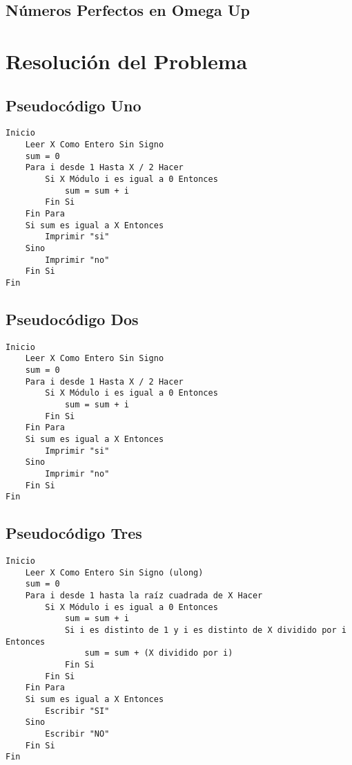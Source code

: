 \documentclass{article}
\begin{document}
    \subsection{Números Perfectos en Omega Up}
    \section{Resolución del Problema}
\subsection{Pseudocódigo Uno}
\lstset{language=pseudocode}
\begin{lstlisting}
Inicio
    Leer X Como Entero Sin Signo
    sum = 0
    Para i desde 1 Hasta X / 2 Hacer
        Si X Módulo i es igual a 0 Entonces
            sum = sum + i    
        Fin Si
    Fin Para
    Si sum es igual a X Entonces
        Imprimir "si"
    Sino
        Imprimir "no"
    Fin Si
Fin
\end{lstlisting}

\subsection{Pseudocódigo Dos}
\lstset{language=pseudocode}
\begin{lstlisting}
Inicio
    Leer X Como Entero Sin Signo
    sum = 0
    Para i desde 1 Hasta X / 2 Hacer
        Si X Módulo i es igual a 0 Entonces
            sum = sum + i  
        Fin Si
    Fin Para
    Si sum es igual a X Entonces
        Imprimir "si"
    Sino
        Imprimir "no"
    Fin Si
Fin
\end{lstlisting}

\subsection{Pseudocódigo Tres}
\lstset{language=pseudocode}
\begin{lstlisting}
Inicio
    Leer X Como Entero Sin Signo (ulong)
    sum = 0
    Para i desde 1 hasta la raíz cuadrada de X Hacer
        Si X Módulo i es igual a 0 Entonces
            sum = sum + i
            Si i es distinto de 1 y i es distinto de X dividido por i Entonces
                sum = sum + (X dividido por i)
            Fin Si
        Fin Si
    Fin Para
    Si sum es igual a X Entonces
        Escribir "SI"
    Sino
        Escribir "NO"
    Fin Si
Fin
\end{lstlisting}
\end{document}
